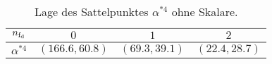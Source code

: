 \begin{table}[h]
       \centering
       \begin{tabular}{c|ccc}
       \toprule \midrule
        $n_{\text{f}_\text{d}}$ 		& $0$ & $1$ & $2$ \\
        \midrule
        $\alpha^{*4}$	& $(166.6, 60.8)$ & $(69.3, 39.1)$  & $(22.4, 28.7)$\\
        \midrule \bottomrule
       \end{tabular}
       \caption{Lage des Sattelpunktes $\alpha^{*4}$ ohne Skalare.}
       \label{tab:beta_QCDxdQCD:Sattelpunkt}
\end{table}